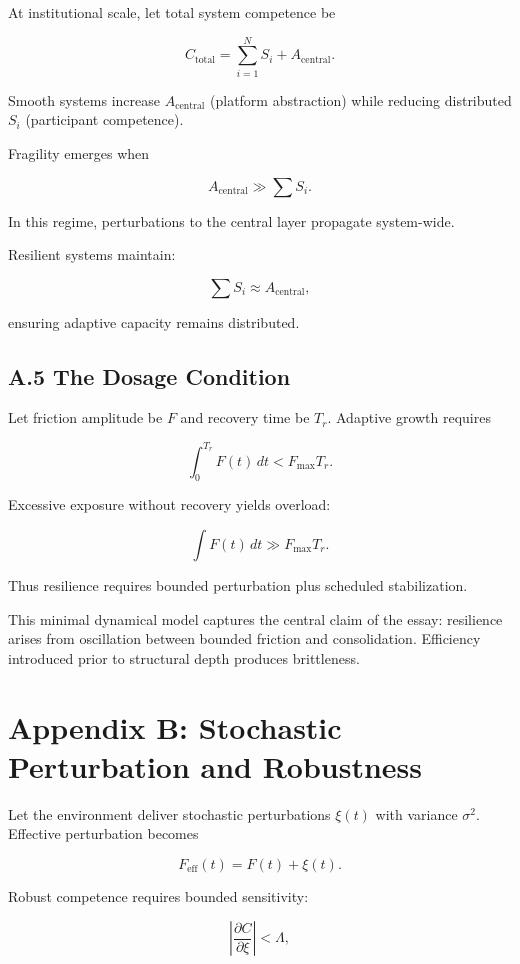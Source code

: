 \documentclass[12pt]{article}
\begin{document}
At institutional scale, let total system competence be

\[
C_{\text{total}} = \sum_{i=1}^N S_i + A_{\text{central}}.
\]

Smooth systems increase $A_{\text{central}}$ (platform abstraction) while reducing distributed $S_i$ (participant competence).

Fragility emerges when

\[
A_{\text{central}} \gg \sum S_i.
\]

In this regime, perturbations to the central layer propagate system-wide.

Resilient systems maintain:

\[
\sum S_i \approx A_{\text{central}},
\]

ensuring adaptive capacity remains distributed.

\subsection*{A.5 The Dosage Condition}

Let friction amplitude be $F$ and recovery time be $T_r$.
Adaptive growth requires

\[
\int_{0}^{T_r} F(t)\,dt < F_{\max} T_r.
\]

Excessive exposure without recovery yields overload:

\[
\int F(t)\,dt \gg F_{\max} T_r.
\]

Thus resilience requires bounded perturbation plus scheduled stabilization.

\bigskip

This minimal dynamical model captures the central claim of the essay:
resilience arises from oscillation between bounded friction and consolidation.
Efficiency introduced prior to structural depth produces brittleness.


\section*{Appendix B: Stochastic Perturbation and Robustness}

Let the environment deliver stochastic perturbations $\xi(t)$ with variance $\sigma^2$.
Effective perturbation becomes

\[
F_{\text{eff}}(t) = F(t) + \xi(t).
\]

Robust competence requires bounded sensitivity:

\[
\left| \frac{\partial C}{\partial \xi} \right| < \Lambda,
\]
\end{document}
